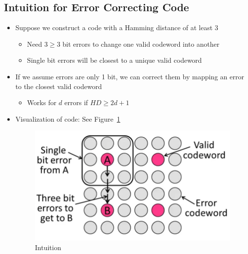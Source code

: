 \documentclass[12pt]{ctexart}   %
\begin{document}
	\subsection{Intuition for Error Correcting Code}
	\begin{itemize}
		\item Suppose we construct a code with a Hamming distance of at least 3
		\begin{itemize}
			\item Need $ 3 \geqslant 3$ bit errors to change one valid codeword into another
			\item Single bit errors will be closest to a unique valid codeword
		\end{itemize}
		
		\item If we assume errors are only 1 bit, we can correct them by mapping an error to the closest valid codeword
		\begin{itemize}
			\item Works for $d$ errors if $HD \geqslant 2d + 1$
		\end{itemize}
		
		\item Visualization of code:     See Figure~\ref{fig:2-10-1}
		\begin{figure}[h!] %
		\centering
		 \includegraphics[scale=0.7]{images/2-10-1}
		\caption{Intuition}
		 \label{fig:2-10-1}
		 \end{figure}
		
	\end{itemize}
	
\end{document}
